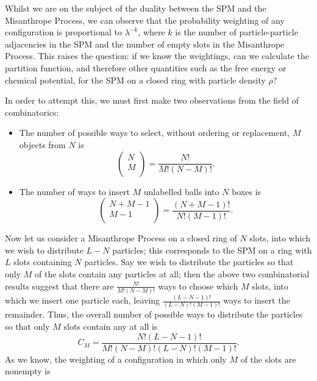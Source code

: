 Whilst we are on the subject of the duality between the SPM and the Misanthrope Process, we
can observe that the probability weighting of any configuration is proportional to $\lambda^{-k}$,
where $k$ is the number of particle-particle adjacencies in the SPM and the number of empty slots
in the Misanthrope Process. This raises the question: if we know the weightings, can we calculate the
partition function, and therefore other quantities such as the free energy or chemical potential,
for the SPM on a closed ring with particle density $\rho$?

In order to attempt this, we must first make two observations from the field of combinatorics:
\begin{itemize}
 \item The number of possible ways to select, without ordering or replacement, $M$ objects from $N$
 is
 \begin{equation}
  \begin{pmatrix}
   N \\
   M \\
  \end{pmatrix}
  = \frac{N!}{M!(N-M)!}.
 \end{equation}
\item The number of ways to insert $M$ unlabelled balls into $N$ boxes is
\begin{equation}
 \begin{pmatrix}
  N+M-1 \\
  M-1 \\
 \end{pmatrix}
 = \frac{(N+M-1)!}{N!(M-1)!}.
\end{equation}
 \end{itemize}
Now let us consider a Misanthrope Process on a closed ring of $N$ slots, into which we wish to
distribute $L-N$ particles; this corresponds to the SPM on a ring with $L$ slots containing $N$
particles. Say we wish to distribute the particles so that only $M$ of the slots
contain any particles at all; then the above two combinatorial results suggest that there are
$\frac{N!}{M!(N-M)!}$ ways to choose which $M$ slots, into which we insert one particle each,
leaving $\frac{(L-N-1)!}{(L-N)!(M-1)!}$ ways to insert the remainder. Thus, the overall number of
possible ways to distribute the particles so that only $M$ slots contain any at all is
\begin{equation}
 C_M = \frac{N!(L-N-1)!}{M!(N-M)!(L-N)!(M-1)!}.
\end{equation}
As we know, the weighting of a configuration in which only $M$ of the slots are nonempty is
